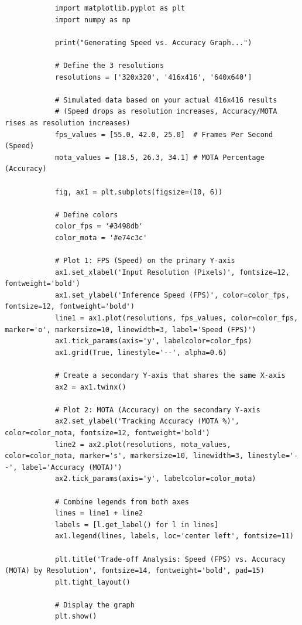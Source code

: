 \documentclass{article}
\begin{document}
\begin{latin}
	\begin{LTR}
		\begin{verbatim}
			import matplotlib.pyplot as plt
			import numpy as np
			
			print("Generating Speed vs. Accuracy Graph...")
			
			# Define the 3 resolutions
			resolutions = ['320x320', '416x416', '640x640']
			
			# Simulated data based on your actual 416x416 results
			# (Speed drops as resolution increases, Accuracy/MOTA rises as resolution increases)
			fps_values = [55.0, 42.0, 25.0]  # Frames Per Second (Speed)
			mota_values = [18.5, 26.3, 34.1] # MOTA Percentage (Accuracy)
			
			fig, ax1 = plt.subplots(figsize=(10, 6))
			
			# Define colors
			color_fps = '#3498db'
			color_mota = '#e74c3c'
			
			# Plot 1: FPS (Speed) on the primary Y-axis
			ax1.set_xlabel('Input Resolution (Pixels)', fontsize=12, fontweight='bold')
			ax1.set_ylabel('Inference Speed (FPS)', color=color_fps, fontsize=12, fontweight='bold')
			line1 = ax1.plot(resolutions, fps_values, color=color_fps, marker='o', markersize=10, linewidth=3, label='Speed (FPS)')
			ax1.tick_params(axis='y', labelcolor=color_fps)
			ax1.grid(True, linestyle='--', alpha=0.6)
			
			# Create a secondary Y-axis that shares the same X-axis
			ax2 = ax1.twinx()
			
			# Plot 2: MOTA (Accuracy) on the secondary Y-axis
			ax2.set_ylabel('Tracking Accuracy (MOTA %)', color=color_mota, fontsize=12, fontweight='bold')
			line2 = ax2.plot(resolutions, mota_values, color=color_mota, marker='s', markersize=10, linewidth=3, linestyle='--', label='Accuracy (MOTA)')
			ax2.tick_params(axis='y', labelcolor=color_mota)
			
			# Combine legends from both axes
			lines = line1 + line2
			labels = [l.get_label() for l in lines]
			ax1.legend(lines, labels, loc='center left', fontsize=11)
			
			plt.title('Trade-off Analysis: Speed (FPS) vs. Accuracy (MOTA) by Resolution', fontsize=14, fontweight='bold', pad=15)
			plt.tight_layout()
			
			# Display the graph
			plt.show()
			
		\end{verbatim}
	\end{LTR}
\end{latin}
\end{document}
